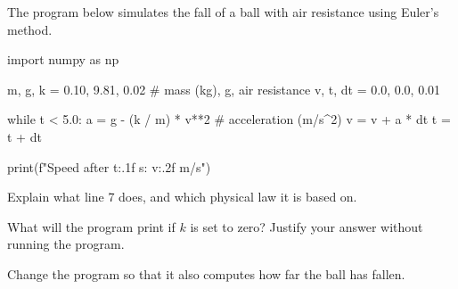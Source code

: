 \documentclass[12pt]{article}
\begin{document}
\begin{exercise}
The program below simulates the fall of a ball with air resistance using Euler's method.

\begin{python}
import numpy as np

m, g, k = 0.10, 9.81, 0.02     # mass (kg), g, air resistance
v, t, dt = 0.0, 0.0, 0.01

while t < 5.0:
    a = g - (k / m) * v**2      # acceleration (m/s^2)
    v = v + a * dt
    t = t + dt

print(f"Speed after {t:.1f} s: {v:.2f} m/s")
\end{python}

\begin{subproblems}
  \item Explain what line 7 does, and which physical law it is based on.
  \item What will the program print if $k$ is set to zero? Justify your answer without running the program.
  \item Change the program so that it also computes how far the ball has fallen.
\end{subproblems}
\end{exercise}
\end{document}
